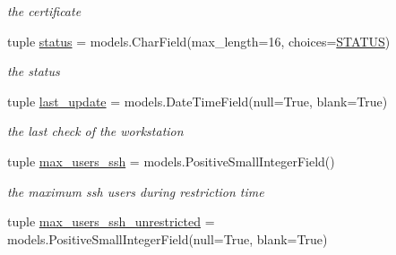 \begin{DoxyCompactItemize}
\begin{DoxyCompactList}\small\item\em the certificate \end{DoxyCompactList}\item 
\hypertarget{classrestriction__system_1_1models_1_1Workstation_aef2eb733d087be3dec44c7f57a5f7afe}{}tuple \hyperlink{classrestriction__system_1_1models_1_1Workstation_aef2eb733d087be3dec44c7f57a5f7afe}{status} = models.\+Char\+Field(max\+\_\+length=16, choices=\hyperlink{classrestriction__system_1_1models_1_1Workstation_a7e10695b3519a406f1c6f605abd10573}{S\+T\+A\+T\+U\+S})\label{classrestriction__system_1_1models_1_1Workstation_aef2eb733d087be3dec44c7f57a5f7afe}

\begin{DoxyCompactList}\small\item\em the status \end{DoxyCompactList}\item 
\hypertarget{classrestriction__system_1_1models_1_1Workstation_a028194999ba2844c707f1fcc2a13a345}{}tuple \hyperlink{classrestriction__system_1_1models_1_1Workstation_a028194999ba2844c707f1fcc2a13a345}{last\+\_\+update} = models.\+Date\+Time\+Field(null=True, blank=True)\label{classrestriction__system_1_1models_1_1Workstation_a028194999ba2844c707f1fcc2a13a345}

\begin{DoxyCompactList}\small\item\em the last check of the workstation \end{DoxyCompactList}\item 
\hypertarget{classrestriction__system_1_1models_1_1Workstation_abbd581a6188e1d98d312e718a9bd7423}{}tuple \hyperlink{classrestriction__system_1_1models_1_1Workstation_abbd581a6188e1d98d312e718a9bd7423}{max\+\_\+users\+\_\+ssh} = models.\+Positive\+Small\+Integer\+Field()\label{classrestriction__system_1_1models_1_1Workstation_abbd581a6188e1d98d312e718a9bd7423}

\begin{DoxyCompactList}\small\item\em the maximum ssh users during restriction time \end{DoxyCompactList}\item 
\hypertarget{classrestriction__system_1_1models_1_1Workstation_abe4ba9864118689be2bc66e2e37f90df}{}tuple \hyperlink{classrestriction__system_1_1models_1_1Workstation_abe4ba9864118689be2bc66e2e37f90df}{max\+\_\+users\+\_\+ssh\+\_\+unrestricted} = models.\+Positive\+Small\+Integer\+Field(null=True, blank=True)\label{classrestriction__system_1_1models_1_1Workstation_abe4ba9864118689be2bc66e2e37f90df}


\end{DoxyCompactItemize}

